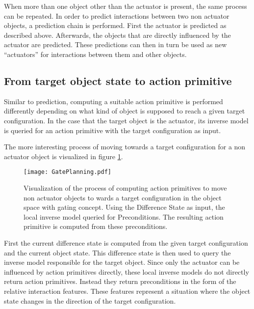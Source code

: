 When more than one object other than the actuator is present, the same process can be repeated. In order to predict interactions between two non actuator objects, a prediction chain is performed. First the actuator is predicted as described above. Afterwards, the objects that are directly influenced by the actuator are predicted. These predictions can then in turn be used as new \enquote{actuators} for interactions between them and other objects. %


\subsection{From target object state to action primitive \label{sec:gatePlanning}}

Similar to prediction, computing a suitable action primitive is performed differently depending on what kind of object is supposed to reach a given target configuration. In the case that the target object is the actuator, its inverse model is queried for an action primitive with the target configuration as input. 

The more interesting process of moving towards a target configuration for a non actuator object is visualized in figure \ref{fig:GatePlanning}.

\begin{figure}
	\centering
	\texttt{[image: GatePlanning.pdf]}
	\caption{Visualization of the process of computing action primitives to move non actuator objects to wards a target configuration in the object space with gating concept. Using the Difference State as input, the local inverse model queried for Preconditions. The resulting action primitive is computed from these preconditions.}
		\label{fig:GatePlanning}
\end{figure}
	
First the current difference state is computed from the given target configuration and the current object state. This difference state is then used to query the inverse model responsible for the target object. Since only the actuator can be influenced by action primitives directly, these local inverse models do not directly return action primitives. Instead they return preconditions in the form of the relative interaction features. These features represent a situation where the object state changes in the direction of the target configuration. 
	
